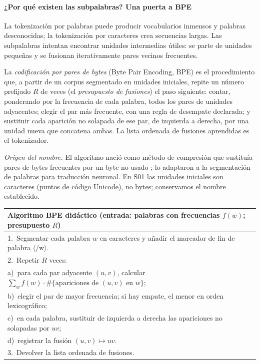 \paragraph{¿Por qué existen las subpalabras? Una puerta a BPE}
La tokenización por palabras puede producir vocabularios inmensos y palabras
desconocidas; la tokenización por caracteres crea secuencias largas. Las
subpalabras intentan encontrar unidades intermedias útiles: se parte de
unidades pequeñas y se fusionan iterativamente pares vecinos frecuentes.

\begin{definicion}\label{s01:def:bpe}
La \emph{codificación por pares de bytes} (Byte Pair Encoding, BPE) es el
procedimiento que, a partir de un corpus segmentado en unidades iniciales,
repite un número prefijado $R$ de veces (el \emph{presupuesto de fusiones}) el
paso siguiente: contar, ponderando por la frecuencia de cada palabra, todos los
pares de unidades adyacentes; elegir el par más frecuente, con una regla de
desempate declarada; y sustituir cada aparición no solapada de ese par, de
izquierda a derecha, por una unidad nueva que concatena ambas. La lista ordenada
de fusiones aprendidas es el tokenizador.
\end{definicion}
\noindent\textit{Origen del nombre.} El algoritmo nació como método de compresión
que sustituía pares de bytes frecuentes por un byte no usado \citep{gage1994bpe};
\citet{sennrich2016} lo adaptaron a la segmentación de palabras para traducción
neuronal. En S01 las unidades iniciales son caracteres (puntos de código Unicode),
no bytes; conservamos el nombre establecido.

\begin{center}\small
\begin{tabular}{@{}l@{}}\toprule
\textbf{Algoritmo BPE didáctico} (entrada: palabras con frecuencias $f(w)$; presupuesto $R$)\\\midrule
1.\ Segmentar cada palabra $w$ en caracteres y añadir el marcador de fin de palabra $\langle/\mathrm w\rangle$.\\
2.\ Repetir $R$ veces:\\
\quad a)\ para cada par adyacente $(u,v)$, calcular $\sum_w f(w)\cdot\#\{\text{apariciones de }(u,v)\text{ en }w\}$;\\
\quad b)\ elegir el par de mayor frecuencia; si hay empate, el menor en orden lexicográfico;\\
\quad c)\ en cada palabra, sustituir de izquierda a derecha las apariciones no solapadas por $uv$;\\
\quad d)\ registrar la fusión $(u,v)\mapsto uv$.\\
3.\ Devolver la lista ordenada de fusiones.\\\bottomrule
\end{tabular}
\end{center}

